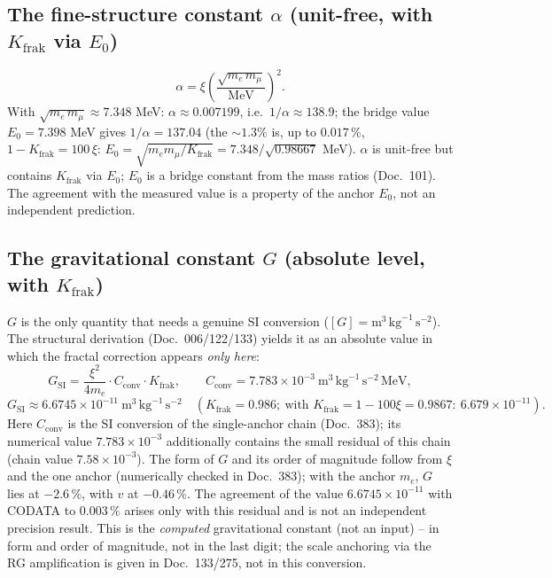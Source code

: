 \subsection{The fine-structure constant $\alpha$ (unit-free, with $K_{\text{frak}}$ via $E_0$)}
\[
\alpha=\xi\left(\frac{\sqrt{m_e\,m_\mu}}{\text{MeV}}\right)^2 .
\]
With $\sqrt{m_e\,m_\mu}\approx 7.348$ MeV: $\alpha\approx 0.007199$, i.e.\ $1/\alpha\approx 138.9$; the
bridge value $E_0=7.398$ MeV gives $1/\alpha=137.04$ (the $\sim1.3\%$ is, up to $0.017\,\%$,
$1-K_{\text{frak}} = 100\,\xi$: $E_0 = \sqrt{m_e m_\mu/K_{\text{frak}}} = 7.348/\sqrt{0.98667}$ MeV). $\alpha$ is unit-free but contains $K_{\text{frak}}$ via $E_0$; $E_0$ is a bridge constant from the mass
ratios (Doc.~101). The agreement with the measured value is a property of the anchor $E_0$, not an
independent prediction.

\subsection{The gravitational constant $G$ (absolute level, with $K_{\text{frak}}$)}
$G$ is the only quantity that needs a genuine SI conversion
($[G]=\text{m}^3\,\text{kg}^{-1}\,\text{s}^{-2}$). The structural derivation (Doc.~006/122/133) yields
it as an absolute value in which the fractal correction appears \emph{only here}:
\[
G_{\text{SI}}=\frac{\xi^2}{4m_e}\cdot C_{\text{conv}}\cdot K_{\text{frak}},
\qquad C_{\text{conv}}=7.783\times10^{-3}\ \text{m}^3\,\text{kg}^{-1}\,\text{s}^{-2}\,\text{MeV},
\]
\[
G_{\text{SI}}\approx 6.6745\times10^{-11}\ \text{m}^3\,\text{kg}^{-1}\,\text{s}^{-2}
\quad (K_{\text{frak}}=0.986;\ \text{with } K_{\text{frak}}=1-100\xi=0.9867:\ 6.679\times10^{-11}).
\]
Here $C_{\text{conv}}$ is the SI conversion of the single-anchor chain (Doc.~383); its numerical value
$7.783\times10^{-3}$ additionally contains the small residual of this chain (chain value
$7.58\times10^{-3}$). The form of $G$ and its order of magnitude follow from $\xi$ and the one anchor
(numerically checked in Doc.~383); with the anchor $m_e$, $G$ lies at $-2.6\,\%$, with $v$ at
$-0.46\,\%$. The agreement of the value $6.6745\times10^{-11}$ with CODATA to $0.003\,\%$ arises only
with this residual and is not an independent precision result.
This is the \emph{computed} gravitational constant (not an input) -- in form and order of magnitude, not
in the last digit; the scale anchoring via the RG
amplification is given in Doc.~133/275, not in this conversion.

